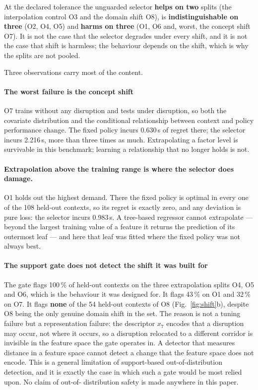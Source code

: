 At the declared tolerance the unguarded selector \textbf{helps on two} splits
(the interpolation control O3 and the domain shift O8), is
\textbf{indistinguishable on three} (O2, O4, O5) and \textbf{harms on three}
(O1, O6 and, worst, the concept shift O7). It is not the case that the selector
degrades under every shift, and it is not the case that shift is harmless; the
behaviour depends on the shift, which is why the splits are not pooled.

Three observations carry most of the content.

\paragraph{The worst failure is the concept shift} O7 trains without any
disruption and tests under disruption, so both the covariate distribution and the
conditional relationship between context and policy performance change. The fixed
policy incurs 0.630\,s of regret there; the selector incurs 2.216\,s, more than
three times as much. Extrapolating a factor level is survivable in this benchmark;
learning a relationship that no longer holds is not.

\paragraph{Extrapolation above the training range is where the selector does
damage.} O1 holds out the highest demand. There the fixed policy is optimal in
every one of the 108 held-out contexts, so its regret is exactly zero, and any
deviation is pure loss: the selector incurs 0.983\,s. A tree-based regressor
cannot extrapolate --- beyond the largest training value of a feature it returns
the prediction of its outermost leaf --- and here that leaf was fitted where the
fixed policy was not always best.

\paragraph{The support gate does not detect the shift it was built for} The gate
flags 100\,\% of held-out contexts on the three extrapolation splits O4, O5 and
O6, which is the behaviour it was designed for. It flags 43\,\% on O1 and 32\,\%
on O7. It flags \textbf{none} of the 54 held-out contexts of O8
(Fig.~\ref{fig:shift}b), despite O8 being the only genuine domain shift in the
set. The reason is not a tuning failure but a representation failure: the
descriptor $x_7$ encodes that a disruption may occur, not where it occurs, so a
disruption relocated to a different corridor is invisible in the feature space the
gate operates in. A detector that measures distance in a feature space cannot
detect a change that the feature space does not encode. This is a general
limitation of support-based out-of-distribution detection, and it is exactly the
case in which such a gate would be most relied upon. No claim of out-of-
distribution safety is made anywhere in this paper.

